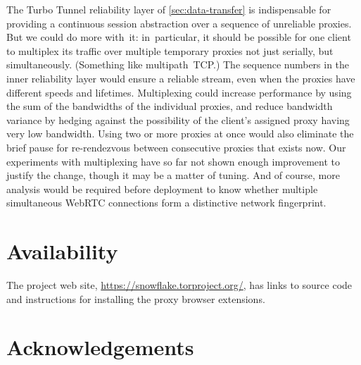\documentclass[letterpaper,twocolumn]{article}
\begin{document}
The Turbo Tunnel reliability layer of \autoref{sec:data-transfer}
is indispensable for providing a continuous session abstraction
over a sequence of unreliable proxies.
But we could do more with~it:
in~particular, it should be possible
for one client to multiplex its traffic
over multiple temporary proxies not just serially, but simultaneously.
(Something like multipath~TCP.)
The sequence numbers in the inner reliability layer
would ensure a reliable stream, even when the proxies
have different speeds and lifetimes.
Multiplexing could increase performance by using the sum
of the bandwidths of the individual proxies,
and reduce bandwidth variance by hedging against the possibility
of the client's assigned proxy having very low bandwidth.
Using two or more proxies at once would also
eliminate the brief pause for re-rendezvous
between consecutive proxies that exists now.
Our experiments with multiplexing have so far
not shown enough improvement to justify the change,
though it may be a matter of tuning.
And of course, more analysis would be required before deployment
to know whether multiple simultaneous WebRTC connections
form a distinctive network fingerprint.

\section*{Availability}

The project web site,
\url{https://snowflake.torproject.org/},
has links to source code
and instructions for installing the proxy browser extensions.

\section*{Acknowledgements}
\end{document}
